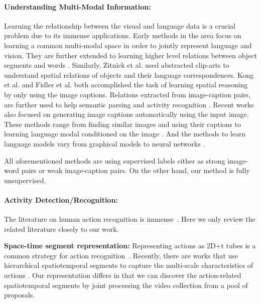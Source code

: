 \paragraph{Understanding Multi-Modal Information:}
Learning the relationship between the visual and language data is a crucial problem due to its immense applications. Early methods \cite{matching} in the area focus on learning a common multi-modal space in order to jointly represent language and vision. They are further extended to learning higher level relations between object segments and words \cite{connecting}. Similarly, Zitnick et al.\cite{zitnick2013learning,zitnick2013bringing} used abstracted clip-arts to understand spatial relations of objects and their language correspondences. Kong et al. \cite{kong2014you} and Fidler et al. \cite{fidler2013sentence} both accomplished the task of learning spatial reasoning by only using the image captions. Relations extracted from image-caption pairs, are further used to help semantic parsing \cite{yu2013grounded} and activity recognition \cite{motwani2012improving}. Recent works also focused on generating image captions automatically using the input image. These methods range from finding similar images and using their captions \cite{ordonez2011im2text} to learning language modal conditioned on the image \cite{kiros2014multimodal,socher2014grounded,farhadi2010every}. And the methods to learn language models vary from graphical models \cite{farhadi2010every} to neural networks \cite{socher2014grounded,kiros2014multimodal,deepAlignment}.

All aforementioned methods are using supervised labels either as strong image-word pairs or weak image-caption pairs. On the other hand, our method is fully unsupervised.

\paragraph{Activity Detection/Recognition:}
The literature on human action recognition is immense~\cite{aggarwal11_acm}. Here we only review the related literature closely to our work.

{\bf Space-time segment representation:} Representing actions as 2D+t tubes is a common strategy for action recognition~\cite{blank05_iccv, brendel11_iccv, ma13_iccv}. Recently, there are works that use hierarchical spatiotemporal segments to capture the multi-scale characteristics of actions \cite{brendel11_iccv, ma13_iccv}. Our representation differs in that we can discover the action-related spatiotemporal segments by joint processing the video collection from a pool of proposals. 

